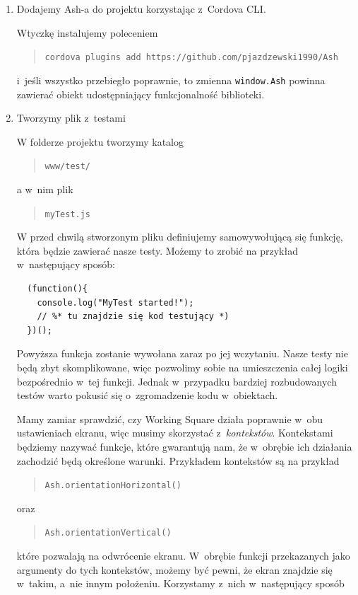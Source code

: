 \documentclass[brudnopis]{xmgr}
\begin{document}
\begin{enumerate}
  \item Dodajemy Ash-a do projektu korzystając z~Cordova CLI.

Wtyczkę instalujemy poleceniem 
\begin{quote}
   \texttt{cordova plugins add https://github.com/pjazdzewski1990/Ash}
\end{quote}
i~jeśli wszystko przebiegło poprawnie, to zmienna \texttt{window.Ash} powinna zawierać obiekt udostępniający funkcjonalność biblioteki.  

 \item Tworzymy plik z~testami

W folderze projektu tworzymy katalog 
\begin{quote}
  \texttt{www/test/}
\end{quote} 
a w~nim plik 
\begin{quote}
  \texttt{myTest.js}
\end{quote} 
W przed chwilą stworzonym pliku definiujemy samowywołującą się funkcję, która będzie zawierać nasze testy. Możemy  to zrobić na przykład w~następujący sposób:

 \begin{lstlisting}
  (function(){
	console.log("MyTest started!");
	// %* tu znajdzie się kod testujący *)
  })();
\end{lstlisting}

Powyższa funkcja zostanie wywołana zaraz po jej wczytaniu. Nasze testy nie będą zbyt skomplikowane, więc pozwolimy sobie na umieszczenia całej logiki bezpośrednio w~tej funkcji. Jednak w~przypadku bardziej rozbudowanych testów warto pokusić się o~zgromadzenie kodu w~obiektach.

Mamy zamiar sprawdzić, czy Working Square działa poprawnie w~obu ustawieniach ekranu, więc musimy skorzystać z~\textit{kontekstów}. Kontekstami będziemy nazywać funkcje, które gwarantują nam, że w~obrębie ich działania zachodzić będą określone warunki. Przykładem kontekstów są na przykład

\begin{quote}
   \texttt{Ash.orientationHorizontal()}
\end{quote}

oraz 

\begin{quote}
   \texttt{Ash.orientationVertical()}
\end{quote}

które pozwalają na odwrócenie ekranu. W~obrębie funkcji przekazanych jako argumenty do tych kontekstów, możemy być pewni, że ekran znajdzie się w~takim, a~nie innym położeniu. Korzystamy z~nich w~następujący sposób


\end{enumerate}
\end{document}
